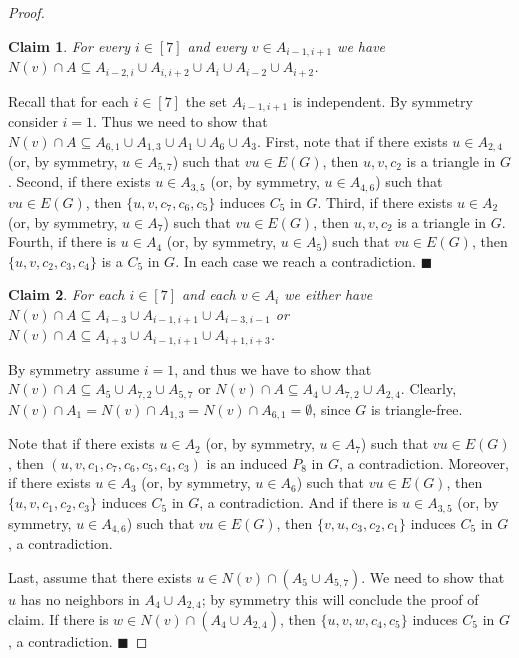 \documentclass[11pt,a4paper]{article}
\theoremstyle{mystyle}
\newtheorem{claim}{Claim}[theorem]
\newenvironment{claimproof}{\noindent {\emph{Proof of Claim.}}}{\hfill$\blacksquare$\medskip}
\begin{document}
\begin{proof}
\begin{claim}
For every $i \in [7]$ and every $v \in A_{i-1,i+1}$ we have $N(v) \cap A \subseteq A_{i-2,i} \cup A_{i,i+2} \cup A_i \cup A_{i-2} \cup A_{i+2}$.
\end{claim}
\begin{claimproof}
Recall that for each $i \in [7]$ the set $A_{i-1,i+1}$ is independent.
By symmetry consider $i=1$. Thus we need to show that $N(v) \cap A \subseteq A_{6,1} \cup A_{1,3} \cup A_1 \cup A_{6} \cup A_{3}$.
First, note that if there exists $u \in A_{2,4}$ (or, by symmetry, $u\in A_{5,7}$) such that $vu \in E(G)$, then $u,v,c_{2}$ is a triangle in $G$.
Second, if there exists $u \in A_{3,5}$ (or, by symmetry, $u\in A_{4,6}$) such that $vu \in E(G)$, then $\{u,v,c_7,c_6,c_5\}$ induces $C_5$ in $G$.
Third, if there exists $u \in A_{2}$ (or, by symmetry, $u\in A_{7}$) such that $vu \in E(G)$, then $u,v,c_{2}$ is a triangle in $G$.
Fourth, if there is $u \in A_{4}$ (or, by symmetry, $u\in A_{5}$) such that $vu \in E(G)$, then $\{u,v,c_{2},c_3,c_4\}$ is a $C_5$ in $G$. In each case we reach a contradiction.
\end{claimproof}

\begin{claim}
For each $i \in [7]$ and each $v \in A_i$ we either have $N(v) \cap A \subseteq A_{i-3} \cup A_{i-1,i+1} \cup A_{i-3,i-1}$ or $N(v) \cap A \subseteq A_{i+3}\cup A_{i-1,i+1} \cup A_{i+1,i+3}$.
\end{claim}
\begin{claimproof}
By symmetry assume $i=1$, and thus we have to show that $N(v) \cap A \subseteq A_{5} \cup A_{7,2} \cup A_{5,7}$ or $N(v) \cap A \subseteq A_{4}\cup A_{7,2} \cup A_{2,4}$. Clearly, $N(v) \cap A_1=N(v) \cap A_{1,3} = N(v) \cap A_{6,1} = \emptyset$, since $G$ is triangle-free.

Note that if there exists $u \in A_{2}$ (or, by symmetry, $u\in A_{7}$) such that $vu \in E(G)$, then $(u,v,c_1,c_7,c_6,c_5,c_4,c_3)$ is an induced $P_8$ in $G$, a contradiction. 
Moreover, if there exists $u \in A_{3}$ (or, by symmetry, $u\in A_{6}$) such that $vu \in E(G)$, then $\{u,v,c_1,c_2,c_3\}$ induces $C_5$ in $G$, a contradiction.
And if there is $u \in A_{3,5}$ (or, by symmetry, $u\in A_{4,6}$) such that $vu \in E(G)$, then $\{v,u,c_3,c_2,c_1\}$ induces $C_5$ in $G$, a contradiction.

Last, assume that there exists $u \in N(v) \cap (A_{5} \cup A_{5,7})$. We need to show that $u$ has no neighbors in $A_{4} \cup A_{2,4}$; by symmetry this will conclude the proof of claim.
If there is $w \in N(v) \cap (A_{4} \cup A_{2,4})$, then $\{u,v,w,c_4,c_5\}$ induces $C_5$ in $G$, a contradiction.
\end{claimproof}


\end{proof}
\end{document}
